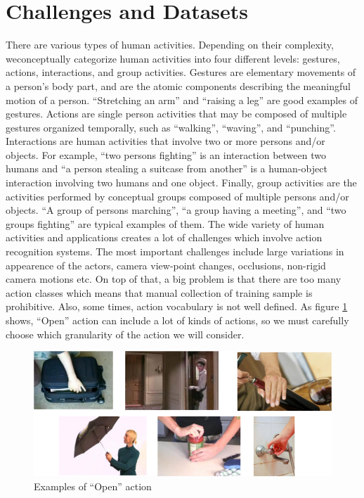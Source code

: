 \documentclass{report}
\begin{document}
\section{Challenges and Datasets}
There are various types of human activities. Depending on their complexity, weconceptually categorize human activities into four different
levels: gestures, actions, interactions, and group activities. Gestures are elementary movements of a person’s body part, and are the atomic
components describing the meaningful motion of a person. ``Stretching an arm'' and ``raising a leg'' are good examples of gestures.
Actions are single person activities that may be composed of multiple gestures organized temporally, such as ``walking'', ``waving'', and
``punching''. Interactions are human activities that involve two or more persons and/or objects. For example, ``two persons fighting'' is
an interaction between two humans and ``a person stealing a suitcase from another'' is a human-object interaction involving two humans and one
object. Finally, group activities are the activities performed by conceptual groups composed of multiple persons and/or objects. ``A group of persons marching'', ``a group having a meeting'', and ``two groups fighting'' are typical examples of them.
The wide variety of human activities and applications creates a lot of challenges which involve action recognition systems.
The most important challenges include large variations in appearence of the actors, camera view-point changes, occlusions,
non-rigid camera motions etc. On top of that, a big problem is that there are too many action classes which means
that manual collection of training sample is prohibitive. Also, some times, action vocabulary is not well defined.
As figure \ref{fig:open_example} shows, ``Open'' action can include a lot of kinds of actions, so we must carefully
choose which granularity of the action we will consider.

\begin{figure}[h]
  \centering
  \includegraphics[scale=0.3]{open_example}
  \caption{Examples of ``Open'' action}
  \label{fig:open_example}

\end{figure}
\end{document}
